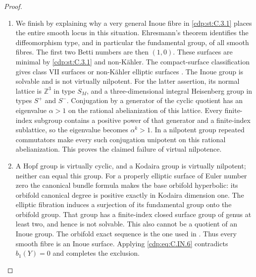 \begin{proof}
\begin{enumerate}[label={$\langle1\rangle$\arabic*.},leftmargin=*]
\item We finish by explaining why a very general Inoue fibre in \ref{cdp:st:C.3.1}
places the entire smooth locus in this situation. Ehresmann's
theorem identifies the diffeomorphism type, and in particular
the fundamental group, of all smooth fibres. The first two
Betti numbers are then $(1,0)$. These surfaces are minimal by
\ref{cdp:st:C.3.1} and non-K\"ahler. The compact-surface classification
gives class VII surfaces or non-K\"ahler elliptic surfaces
\cite[Theorem 3.2]{BMS2012}.
The Inoue group is solvable and is not virtually nilpotent.
For the latter assertion, its normal lattice is $\mathbb Z^3$
in type $S_M$, and a three-dimensional integral Heisenberg group
in types $S^{+}$ and $S^{-}$. Conjugation by a generator of the
cyclic quotient has an eigenvalue $\alpha>1$ on the rational
abelianization of this lattice. Every finite-index subgroup
contains a positive power of that generator and a finite-index
sublattice, so the eigenvalue becomes $\alpha^k>1$. In a
nilpotent group repeated commutators make every such conjugation
unipotent on this rational abelianization. This proves the
claimed failure of virtual nilpotence.

\item A Hopf group is virtually cyclic, and a Kodaira group is virtually
nilpotent; neither can equal this group. For a properly elliptic
surface of Euler number zero the canonical bundle formula makes
the base orbifold hyperbolic: its orbifold canonical degree is
positive exactly in Kodaira dimension one. The elliptic
fibration induces a surjection of its fundamental group onto the
orbifold group. That group has a finite-index closed surface
group of genus at least two, and hence is not solvable. This
also cannot be a quotient of an Inoue group. The orbifold exact
sequence is the one used in \cite[Section 3.3]{BMS2012}.
Thus every smooth fibre is an Inoue surface. Applying \eqref{cdp:eq:C.IN.6}
contradicts $b_1(Y)=0$ and completes the exclusion.

\end{enumerate}
\end{proof}
